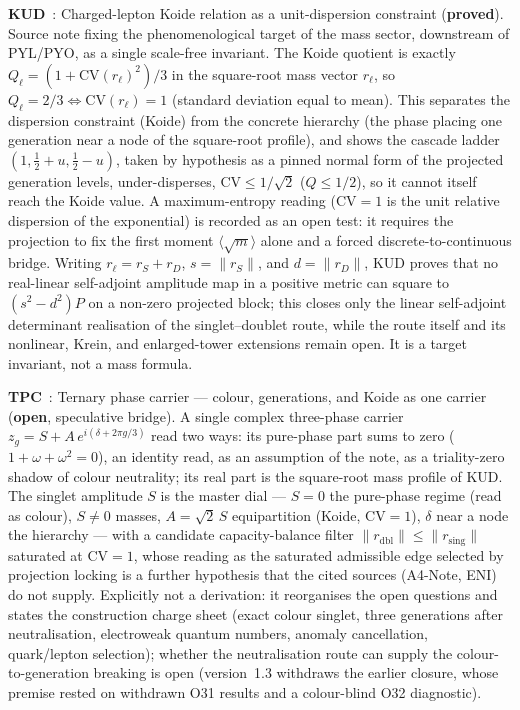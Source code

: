 \documentclass[11pt,a4paper]{article}
\newcommand{\sproved}{\textcolor{cproved}{\textbf{proved}}}
\newcommand{\sopen}{\textcolor{copen}{\textbf{open}}}
\begin{document}
    \textbf{KUD}~\cite{Beau2026kud}: Charged-lepton Koide relation as a unit-dispersion constraint (\sproved).
    Source note fixing the phenomenological target of the mass sector, downstream of PYL/PYO, as a single scale-free
    invariant.
    The Koide quotient is exactly $Q_\ell = (1 + \mathrm{CV}(r_\ell)^2)/3$ in the square-root mass vector $r_\ell$,
    so $Q_\ell = 2/3 \iff \mathrm{CV}(r_\ell) = 1$ (standard deviation equal to mean).
    This separates the dispersion constraint (Koide) from the concrete hierarchy (the phase placing one generation
    near a node of the square-root profile), and shows the cascade ladder
    $(1, \tfrac12 + u, \tfrac12 - u)$, taken by hypothesis as a pinned normal form of the projected generation levels,
    under-disperses, $\mathrm{CV} \le 1/\sqrt2$ ($Q \le 1/2$), so it cannot itself
    reach the Koide value.
    A maximum-entropy reading ($\mathrm{CV} = 1$ is the unit relative dispersion of the exponential) is recorded as
    an open test: it requires the projection to fix the first moment $\langle \sqrt m \rangle$ alone and a forced
    discrete-to-continuous bridge.
    Writing $r_\ell=r_S+r_D$, $s=\lVert r_S\rVert$, and $d=\lVert r_D\rVert$, KUD proves that no real-linear
    self-adjoint amplitude map in a positive metric can square to $(s^2-d^2)P$ on a non-zero projected block; this
    closes only the linear self-adjoint determinant realisation of the singlet--doublet route, while the route itself
    and its nonlinear, Krein, and enlarged-tower extensions remain open.
    It is a target invariant, not a mass formula.

    \textbf{TPC}~\cite{Beau2026tpc}: Ternary phase carrier --- colour, generations, and Koide as one carrier
    (\sopen, speculative bridge).
    A single complex three-phase carrier $z_g = S + A\,e^{i(\delta + 2\pi g/3)}$ read two ways: its pure-phase part
    sums to zero ($1+\omega+\omega^2=0$), an identity read, as an assumption of the note, as a triality-zero shadow
    of colour neutrality; its real part is the square-root mass profile of
    KUD.
    The singlet amplitude $S$ is the master dial --- $S=0$ the pure-phase regime (read as colour), $S\neq0$ masses, $A=\sqrt2\,S$
    equipartition (Koide, $\mathrm{CV}=1$), $\delta$ near a node the hierarchy --- with a candidate capacity-balance
    filter $\lVert r_{\mathrm{dbl}}\rVert \le \lVert r_{\mathrm{sing}}\rVert$ saturated at $\mathrm{CV}=1$, whose reading as the saturated admissible edge selected by projection locking is a
    further hypothesis that the cited sources (A4-Note, ENI) do not supply.
    Explicitly not a derivation: it reorganises the open questions and states the construction charge sheet
    (exact colour singlet, three generations after neutralisation, electroweak quantum numbers, anomaly
    cancellation, quark/lepton selection); whether the neutralisation route can supply the colour-to-generation
    breaking is open (version~1.3 withdraws the earlier closure, whose premise rested on withdrawn O31 results
    and a colour-blind O32 diagnostic).
\end{document}
